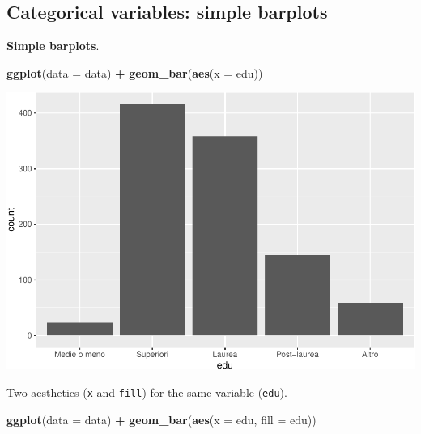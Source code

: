 \documentclass[
]{book}
\newenvironment{Shaded}{\begin{snugshade}}{\end{snugshade}}
\newcommand{\AttributeTok}[1]{\textcolor[rgb]{0.13,0.29,0.53}{#1}}
\newcommand{\FunctionTok}[1]{\textcolor[rgb]{0.13,0.29,0.53}{\textbf{#1}}}
\newcommand{\NormalTok}[1]{#1}
\newcommand{\SpecialCharTok}[1]{\textcolor[rgb]{0.81,0.36,0.00}{\textbf{#1}}}
\begin{document}
\hypertarget{categorical-variables-simple-barplots}{%
\subsection{Categorical variables: simple barplots}\label{categorical-variables-simple-barplots}}

\textbf{Simple barplots}.

\begin{Shaded}
\begin{Highlighting}[]
\FunctionTok{ggplot}\NormalTok{(}\AttributeTok{data =}\NormalTok{ data) }\SpecialCharTok{+}
  \FunctionTok{geom\_bar}\NormalTok{(}\FunctionTok{aes}\NormalTok{(}\AttributeTok{x =}\NormalTok{ edu))}
\end{Highlighting}
\end{Shaded}

\includegraphics{R-for-social-research-and-business-analytics_files/figure-latex/unnamed-chunk-25-1.pdf}

Two aesthetics (\texttt{x} and \texttt{fill}) for the same variable (\texttt{edu}).

\begin{Shaded}
\begin{Highlighting}[]
\FunctionTok{ggplot}\NormalTok{(}\AttributeTok{data =}\NormalTok{ data) }\SpecialCharTok{+}
  \FunctionTok{geom\_bar}\NormalTok{(}\FunctionTok{aes}\NormalTok{(}\AttributeTok{x =}\NormalTok{ edu, }\AttributeTok{fill =}\NormalTok{ edu))}
\end{Highlighting}
\end{Shaded}
\end{document}
